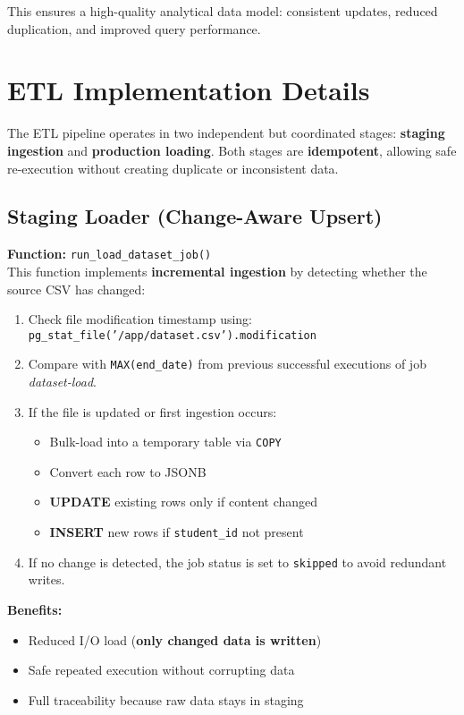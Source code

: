 \documentclass[11pt]{article}
\begin{document}
This ensures a high-quality analytical data model: consistent updates, reduced duplication, and improved query performance.


\section{ETL Implementation Details}

The ETL pipeline operates in two independent but coordinated stages: \textbf{staging ingestion} and \textbf{production loading}. Both stages are \textbf{idempotent}, allowing safe re-execution without creating duplicate or inconsistent data.

\subsection*{Staging Loader (Change-Aware Upsert)}

\textbf{Function:} \texttt{run\_load\_dataset\_job()}\\[4pt]
This function implements \textbf{incremental ingestion} by detecting whether the source CSV has changed:

\begin{enumerate}[leftmargin=1.6em]
\item Check file modification timestamp using:\newline
\texttt{pg\_stat\_file('/app/dataset.csv').modification}
\item Compare with \texttt{MAX(end\_date)} from previous successful executions of job \textit{dataset-load}.
\item If the file is updated or first ingestion occurs:
    \begin{itemize}
      \item Bulk-load into a temporary table via \texttt{COPY}
      \item Convert each row to JSONB
      \item \textbf{UPDATE} existing rows only if content changed
      \item \textbf{INSERT} new rows if \texttt{student\_id} not present
    \end{itemize}
\item If no change is detected, the job status is set to \texttt{skipped} to avoid redundant writes.
\end{enumerate}

\textbf{Benefits:}
\begin{itemize}
\item Reduced I/O load (\textbf{only changed data is written})
\item Safe repeated execution without corrupting data
\item Full traceability because raw data stays in staging
\end{itemize}
\end{document}
